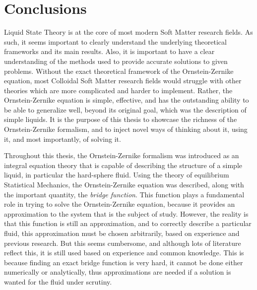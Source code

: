\chapter{Conclusions}
\label{Cap6}

Liquid State Theory is at the core of most modern Soft Matter research fields. As such, it 
seems important to clearly understand the underlying theoretical frameworks and its main 
results. Also, it is important to have a clear understanding of the methods used to provide 
accurate solutions to given problems. Without the exact theoretical framework of the 
Ornstein-Zernike equation, most Colloidal Soft Matter research fields would struggle with 
other theories which are more complicated and harder to implement. Rather, the 
Ornstein-Zernike equation is simple, effective, and has the outstanding ability to be able 
to generalize well, beyond its original goal, which was the description of simple liquids. 
It is the purpose of this thesis to showcase the richness of the Ornstein-Zernike 
formalism, and to inject novel ways of thinking about it, using it, and most importantly, 
of solving it.

Throughout this thesis, the Ornstein-Zernike formalism was introduced as an integral 
equation theory that is capable of describing the structure of a simple liquid, in 
particular the hard-sphere fluid. Using the theory of equilibrium Statistical Mechanics, 
the Ornstein-Zernike equation was described, along with the important quantity, the 
\emph{bridge function}. This function plays a fundamental role in trying to solve the 
Ornstein-Zernike equation, because it provides an approximation to the system that is the 
subject of study. However, the reality is that this function is still an approximation, and 
to correctly describe a particular fluid, this approximation must be chosen arbitrarily, 
based on experience and previous research. But this seems cumbersome, and although lots of 
literature reflect this, it is still used based on experience and common knowledge. This is 
because finding an exact bridge function is very hard, it cannot be done either numerically 
or analytically, thus approximations are needed if a solution is wanted for the fluid under 
scrutiny.

